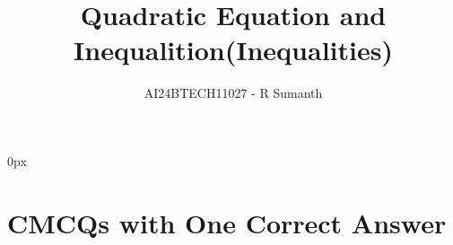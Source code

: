 \documentclass[journal,12pt,twocolumn]{IEEEtran}
\theoremstyle{remark}
\begin{document}
\parindent 0px


\vspace{3cm}

\title{Quadratic Equation and Inequalition(Inequalities)}

\author{AI24BTECH11027 - R Sumanth }
\maketitle 
\newpage
\bigskip

\renewcommand{\thefigure}{\theenumi}
\renewcommand{\thetable}{\theenumi}
\section*{C\quad\quad MCQs with One Correct Answer}
\begin{enumerate}


\end{enumerate}
\end{document}
